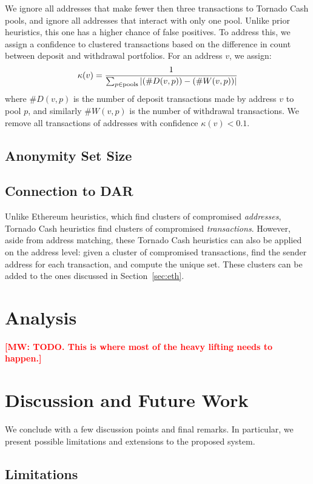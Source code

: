 \documentclass[11pt,a4paper]{article}
\newcommand{\mike}[1]{\textcolor{red}{\bf [MW: #1]}}
\begin{document}
We ignore all addresses that make fewer then three transactions to Tornado Cash pools, and ignore all addresses that interact with only one pool. Unlike prior heuristics, this one has a higher chance of false positives. To address this, we assign a confidence to clustered transactions based on the difference in count between deposit and withdrawal portfolios. For an address $v$, we assign:
\begin{equation*}
  \kappa(v) = \frac{1}{\sum_{p \in \textup{pools}} |(\#D(v,p)) - (\#W(v,p))| }
\end{equation*}
where $\#D(v,p)$ is the number of deposit transactions made by address $v$ to pool $p$, and similarly $\#W(v, p)$ is the number of withdrawal transactions. We remove all transactions of addresses with confidence $\kappa(v) < 0.1$.

\subsection{Anonymity Set Size}

\subsection{Connection to DAR}

Unlike Ethereum heuristics, which find clusters of compromised \textit{addresses}, Tornado Cash heuristics find clusters of compromised \textit{transactions}. However, aside from address matching, these Tornado Cash heuristics can also be applied on the address level: given a cluster of compromised transactions, find the sender address for each transaction, and compute the unique set. These clusters can be added to the ones discussed in Section~\ref{sec:eth}.

\section{Analysis}

\mike{TODO. This is where most of the heavy lifting needs to happen.}

\section{Discussion and Future Work}

We conclude with a few discussion points and final remarks. In particular, we present possible limitations and extensions to the proposed system.

\subsection{Limitations}
\end{document}
